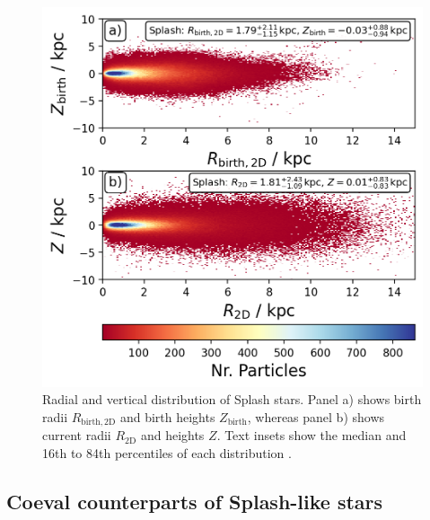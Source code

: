 \documentclass[fleqn,usenatbib]{mnras}
\begin{document}
\begin{figure}
    \centering
    \includegraphics[width=\columnwidth]{figures/splash_rz_birth_now.png}
    \caption{Radial and vertical distribution of Splash stars. Panel a) shows birth radii $R_\mathrm{birth, 2D}$ and birth heights $Z_\mathrm{birth}$, whereas panel b) shows current radii $R_\mathrm{2D}$ and heights $Z$. Text insets show the median and 16th to 84th percentiles of each distribution
    \href{https://github.com/svenbuder/golden_thread_II/tree/main/figures}{\faGithub}.}
    \label{fig:splash_rz_birth_now}
\end{figure}

\subsection{Coeval counterparts of Splash-like stars}
\end{document}
